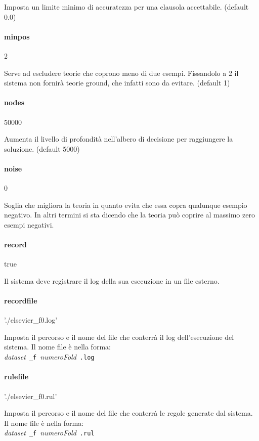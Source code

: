    Imposta un limite minimo di accuratezza per una clausola accettabile. (default 0.0) 

\paragraph{minpos}   2

Serve ad escludere teorie che coprono
meno di due esempi. Fissandolo a 2 il
sistema non fornirà teorie ground, che
infatti sono da evitare. (default 1)


\paragraph{nodes}   50000

Aumenta il livello di profondità nell’albero di decisione per raggiungere la soluzione. (default 5000)

\paragraph{noise}   0

Soglia che migliora la teoria in quanto
evita che essa copra qualunque esempio
negativo. In altri termini si sta dicendo
che la teoria può coprire al massimo zero
esempi negativi.

\paragraph{record}   true

   Il sistema deve registrare il log della sua esecuzione in un file esterno.

\paragraph{recordfile}   './elsevier\_f0.log'

   Imposta il percorso e il nome del file che conterrà il log dell'esecuzione del sistema. Il nome file è nella forma:\\ \emph{dataset}~\verb+_f+~\emph{numeroFold}~\verb+.log+ 

\paragraph{rulefile}   './elsevier\_f0.rul'

         Imposta il percorso e il nome del file che conterrà le regole generate dal sistema. Il nome file è nella forma:\\ \emph{dataset}~\verb+_f+~\emph{numeroFold}~\verb+.rul+ 

